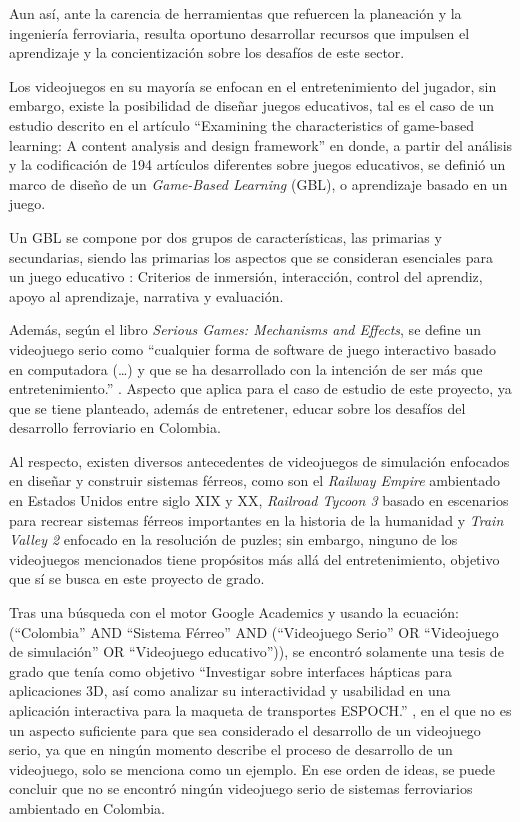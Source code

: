 Aun así, ante la carencia de herramientas que refuercen la planeación y la ingeniería ferroviaria, resulta oportuno desarrollar recursos que impulsen el aprendizaje y la concientización sobre los desafíos de este sector.

Los videojuegos en su mayoría se enfocan en el entretenimiento del jugador, sin embargo, existe la posibilidad de diseñar juegos educativos, tal es el caso de un estudio descrito en el artículo “Examining the characteristics of game-based learning: A content analysis and design framework” \autocite{gblFrameworkExamining} en donde, a partir del análisis y la codificación de 194 artículos diferentes sobre juegos educativos, se definió un marco de diseño de un \textit{Game-Based Learning} (GBL), o aprendizaje basado en un juego.

Un GBL se compone por dos grupos de características, las primarias y secundarias, siendo las primarias los aspectos que se consideran esenciales para un juego educativo \autocite{gblFrameworkExamining}: Criterios de inmersión, interacción, control del aprendiz, apoyo al aprendizaje, narrativa y evaluación.

Además, según el libro \textit{Serious Games: Mechanisms and Effects}, se define un videojuego serio como “cualquier forma de software de juego interactivo basado en computadora (…) y que se ha desarrollado con la intención de ser más que entretenimiento.” \autocite[p.~6]{seriousGamesMechanisms}. Aspecto que aplica para el caso de estudio de este proyecto, ya que se tiene planteado, además de entretener, educar sobre los desafíos del desarrollo ferroviario en Colombia.

Al respecto, existen diversos antecedentes de videojuegos de simulación enfocados en diseñar y construir sistemas férreos, como son el \textit{Railway Empire} \autocite{railwayEmpire} ambientado en Estados Unidos entre siglo XIX y XX, \textit{Railroad Tycoon 3} \autocite{railroadTycoon3} basado en escenarios para recrear sistemas férreos importantes en la historia de la humanidad y \textit{Train Valley 2} \autocite{trainValley2} enfocado en la resolución de puzles; sin embargo, ninguno de los videojuegos mencionados tiene propósitos más allá del entretenimiento, objetivo que sí se busca en este proyecto de grado.

Tras una búsqueda con el motor Google Academics y usando la ecuación: (“Colombia” AND “Sistema Férreo” AND (“Videojuego Serio” OR “Videojuego de simulación” OR “Videojuego educativo”)), se encontró solamente una tesis de grado que tenía como objetivo “Investigar sobre interfaces hápticas para aplicaciones 3D, así como analizar su interactividad y usabilidad en una aplicación interactiva para la maqueta de transportes ESPOCH.” \autocite{tesisInterfacesHapticas}, en el que no es un aspecto suficiente para que sea considerado el desarrollo de un videojuego serio, ya que en ningún momento describe el proceso de desarrollo de un videojuego, solo se menciona como un ejemplo. En ese orden de ideas, se puede concluir que no se encontró ningún videojuego serio de sistemas ferroviarios ambientado en Colombia.

